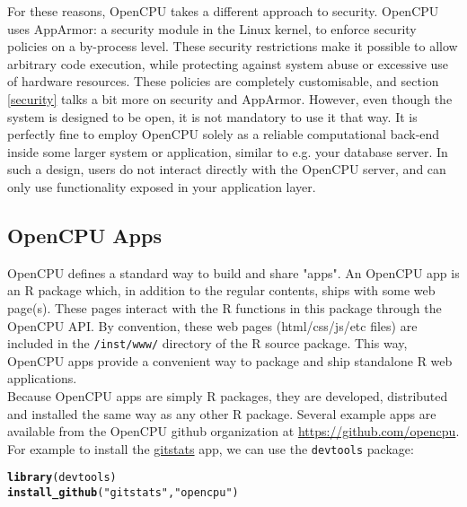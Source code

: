 \documentclass{scrartcl}\usepackage[]{graphicx}\usepackage[]{color}
\makeatletter
\newcommand{\hlstr}[1]{\textcolor[rgb]{0.192,0.494,0.8}{#1}}%
\newcommand{\hlstd}[1]{\textcolor[rgb]{0.345,0.345,0.345}{#1}}%
\newcommand{\hlkwd}[1]{\textcolor[rgb]{0.737,0.353,0.396}{\textbf{#1}}}%
\newenvironment{kframe}{%
 \def\at@end@of@kframe{}%
 \ifinner\ifhmode%
  \def\at@end@of@kframe{\end{minipage}}%
  \begin{minipage}{\columnwidth}%
 \fi\fi%
 \def\FrameCommand##1{\hskip\@totalleftmargin \hskip-\fboxsep
 \colorbox{shadecolor}{##1}\hskip-\fboxsep
     \hskip-\linewidth \hskip-\@totalleftmargin \hskip\columnwidth}%
 \MakeFramed {\advance\hsize-\width
   \@totalleftmargin\z@ \linewidth\hsize
   \@setminipage}}%
 {\par\unskip\endMakeFramed%
 \at@end@of@kframe}
\newenvironment{knitrout}{}{} %
\makeatother
\begin{document}
For these reasons, OpenCPU takes a different approach to security. OpenCPU uses AppArmor: a security module in the Linux kernel, to enforce security policies on a by-process level. These security restrictions make it possible to allow arbitrary code execution, while protecting against system abuse or excessive use of hardware resources. These policies are completely customisable, and section \ref{security} talks a bit more on security and AppArmor. However, even though the system is designed to be open, it is not mandatory to use it that way. It is perfectly fine to employ OpenCPU solely as a reliable computational back-end inside some larger system or application, similar to e.g. your database server. In such a design, users do not interact directly with the OpenCPU server, and can only use functionality exposed in your application layer.

\subsection{OpenCPU Apps}

OpenCPU defines a standard way to build and share "apps". An OpenCPU app is an R package which, in addition to the regular contents, ships with some web page(s). These pages interact with the R functions in this package through the OpenCPU API. By convention, these web pages (html/css/js/etc files) are included in the \texttt{/inst/www/} directory of the R source package. This way, OpenCPU apps provide a convenient way to package and ship standalone R web applications. \\

\noindent Because OpenCPU apps are simply R packages, they are developed, distributed and installed the same way as any other R package. Several example apps are available from the OpenCPU github organization at \href{https://github.com/opencpu}{https://github.com/opencpu}. For example to install the \href{https://github.com/opencpu/gitstats}{gitstats} app, we can use the \texttt{devtools} package:

\begin{knitrout}
\color{fgcolor}\begin{kframe}
\begin{alltt}
\hlkwd{library}\hlstd{(devtools)}
\hlkwd{install_github}\hlstd{(}\hlstr{"gitstats"}\hlstd{,} \hlstr{"opencpu"}\hlstd{)}
\end{alltt}
\end{kframe}
\end{knitrout}
\end{document}
